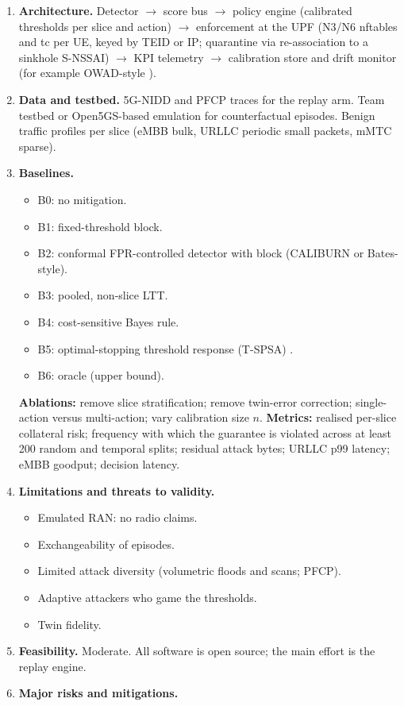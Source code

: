 \begin{enumerate}
  \(\beta\)-mixing episodes or for TV-bounded shift, following
  \citep{barber2023beyond}.
\item
  \textbf{Architecture.} Detector $\rightarrow$ score bus $\rightarrow$ policy engine
  (calibrated thresholds per slice and action) $\rightarrow$ enforcement at the UPF
  (N3/N6 nftables and tc per UE, keyed by TEID or IP; quarantine via
  re-association to a sinkhole S-NSSAI) $\rightarrow$ KPI telemetry $\rightarrow$ calibration
  store and drift monitor (for example OWAD-style \citep{han2023owad}).
\item
  \textbf{Data and testbed.} 5G-NIDD and PFCP traces for the replay arm.
  Team testbed or Open5GS-based emulation for counterfactual episodes.
  Benign traffic profiles per slice (eMBB bulk, URLLC periodic small
  packets, mMTC sparse).
\item
  \textbf{Baselines.}

  \begin{itemize}
  \tightlist
  \item
    B0: no mitigation.
  \item
    B1: fixed-threshold block.
  \item
    B2: conformal FPR-controlled detector with block (CALIBURN or
    Bates-style).
  \item
    B3: pooled, non-slice LTT.
  \item
    B4: cost-sensitive Bayes rule.
  \item
    B5: optimal-stopping threshold response (T-SPSA)
    \citep{hammar2022optimalstopping}.
  \item
    B6: oracle (upper bound).
  \end{itemize}

  \textbf{Ablations:} remove slice stratification; remove twin-error
  correction; single-action versus multi-action; vary calibration size
  \(n\). \textbf{Metrics:} realised per-slice collateral risk; frequency
  with which the guarantee is violated across at least 200 random and
  temporal splits; residual attack bytes; URLLC p99 latency; eMBB
  goodput; decision latency.
\item
  \textbf{Limitations and threats to validity.}

  \begin{itemize}
  \tightlist
  \item
    Emulated RAN: no radio claims.
  \item
    Exchangeability of episodes.
  \item
    Limited attack diversity (volumetric floods and scans; PFCP).
  \item
    Adaptive attackers who game the thresholds.
  \item
    Twin fidelity.
  \end{itemize}
\item
  \textbf{Feasibility.} Moderate. All software is open source; the main
  effort is the replay engine.
\item
  \textbf{Major risks and mitigations.}


\end{enumerate}
